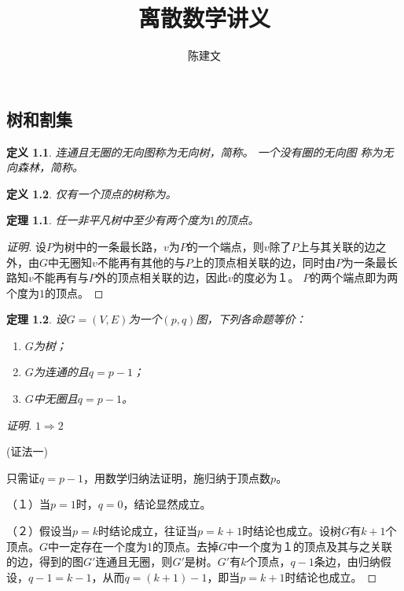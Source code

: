 \documentclass{book}[oneside]
\newtheorem{Def}{定义}
\newtheorem{Thm}{定理}
\begin{document}
\begin{CJK*}{UTF8}{gbsn}
  \title{离散数学讲义}
  \author{陈建文}
  \maketitle
  


  \setcounter{chapter}{6}
  \chapter{树和割集}
  \begin{Def}
    连通且无圈的无向图称为无向树，简称{}。 一个没有圈的无向图
    称为无向森林，简称{}。
  \end{Def}

  \begin{Def}
    仅有一个顶点的树称为{}。
  \end{Def}
  \begin{Thm}
    任一非平凡树中至少有两个度为$1$的顶点。
  \end{Thm}
  \begin{proof}[证明]
    设$P$为树中的一条最长路，$v$为$P$的一个端点，则$v$除了$P$上与其关联的边之外，由$G$中无圈知$v$不能再有其他的与$P$上的顶点相关联的边，同时由$P$为一条最长路知$v$不能再有与$P$外的顶点相关联的边，因此$v$的度必为１。
    $P$的两个端点即为两个度为$1$的顶点。
  \end{proof}
  \begin{Thm}
  设$G=(V,E)$为一个$(p,q)$图，下列各命题等价：
  \begin{enumerate}
  \item $G$为树；
  \item $G$为连通的且$q = p - 1$；
  \item $G$中无圈且$q = p - 1$。
  \end{enumerate}
\end{Thm}
\begin{proof}[证明]  \mbox{}\par{}

  $1\Rightarrow2$

  (证法一)
  
    只需证$q=p-1$，用数学归纳法证明，施归纳于顶点数$p$。
    
    （１）当$p=1$时，$q=0$，结论显然成立。

    （２）假设当$p=k$时结论成立，往证当$p=k+1$时结论也成立。设树$G$有$k+1$个顶点。$G$中一定存在一个度为1的顶点。去掉$G$中一个度为１的顶点及其与之关联的边，得到的图$G'$连通且无圈，则$G'$是树。$G'$有$k$个顶点，$q-1$条边，由归纳假设，$q-1 = k - 1$，从而$q = (k +1) - 1$，即当$p=k+1$时结论也成立。


\end{proof}
\end{CJK*}
\end{document}
